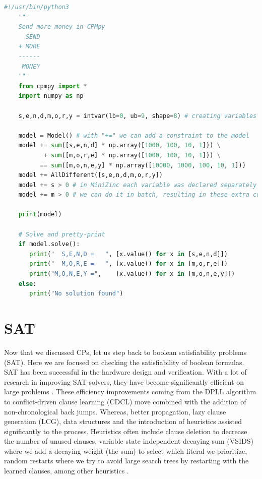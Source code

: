 \begin{lstlisting}[language=python, label={lst:SendMoreMoneyCPMpy},  caption={Solution to the puzzle “send more money”. Modified from the example in the CPMpy repository \url{https://github.com/CPMpy/cpmpy/blob/master/examples/send_more_money.py}}]
	#!/usr/bin/python3
	"""
	Send more money in CPMpy
	  SEND
	+ MORE
	------
	 MONEY
	"""
	from cpmpy import *
	import numpy as np
	
	s,e,n,d,m,o,r,y = intvar(lb=0, ub=9, shape=8) # creating variables
	
	model = Model() # with "+=" we can add a constraint to the model
	model += sum([s,e,n,d] * np.array([1000, 100, 10, 1])) \
	       + sum([m,o,r,e] * np.array([1000, 100, 10, 1])) \
	      == sum([m,o,n,e,y] * np.array([10000, 1000, 100, 10, 1]))
	model += AllDifferent([s,e,n,d,m,o,r,y])
	model += s > 0 # in MiniZinc each variable was declared separately in CPMpy 
	model += m > 0 # we can do it in batch, resulting in these extra constraints 
	
	print(model)
	
	# Solve and pretty-print
	if model.solve():
	   print("  S,E,N,D =   ", [x.value() for x in [s,e,n,d]])
	   print("  M,O,R,E =   ", [x.value() for x in [m,o,r,e]])
	   print("M,O,N,E,Y =",    [x.value() for x in [m,o,n,e,y]])
	else:
	   print("No solution found")
\end{lstlisting}



\section{SAT}
\label{CS:SAT}
Now that we discussed CPs, let us step back to boolean satisfiability problems (SAT). Here we are focused on checking the satisfiability of boolean formulas. SAT has been successful in the hardware design and verification. With a lot of research in improving SAT-solvers, they have become significantly efficient on large problems \cite{56bardin2019bringing}.
These efficiency improvements coming from the DPLL algorithm to conflict-driven clause learning (CDCL) move combined with the addition of non-chronological back jumps. Whereas, better propagation, lazy clause generation (LCG), data structures and the introduction of heuristics assisted significantly to the process. Heuristics often include clause deletion to decrease the number of unused clauses, variable state independent decaying sum (VSIDS) where we add a decaying weight (the sum) to select which literal we prioritize, random restarts where we try to avoid large search trees by restarting with the learned clauses, among other heuristics \cite{61MCSMarcDenecker, 60katebi2011empirical, 67stuckey2010lazyClauseGeneration}.

